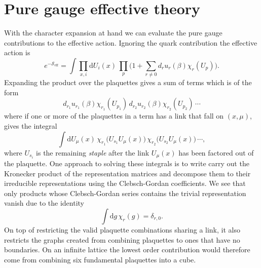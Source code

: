 \section{Pure gauge effective theory}

With the character expansion at hand we can evaluate the pure gauge
contributions to the effective action. Ignoring the quark contribution the
effective action is
%
\begin{equation}
  e^{-\mathcal{S}_{\text{eff}}} = \int \prod_{x, i} \mathrm{d} U_i(x) \, \prod_p
    \bigg(1 + \sum_{r \neq 0} d_r u_r(\beta) \chi_r (U_p) \bigg).
\end{equation}
%
Expanding the product over the plaquettes gives a sum of terms which is of the
form
%
\begin{equation}
  d_{r_1} u_{r_1}(\beta) \chi_{r_1}(U_{p_1}) \, 
  d_{r_2} u_{r_2}(\beta) \chi_{r_2}(U_{p_2}) \, \cdots
\end{equation}
%
where if one or more of the plaquettes in a term has a link that fall on
$(x,\mu)$, gives the integral
%
\begin{equation}
  \int \mathrm{d} U_{\mu}(x) \, \chi_{r_1} \big(U_{s_1} U_{\mu}(x) \big) \,
    \chi_{r_2} \big(U_{s_2} U_{\mu}(x) \big) \, \cdots,
\end{equation}
%
where $U_{s_i}$ is the remaining \emph{staple} after the link $U_{\mu}(x)$ has
been factored out of the plaquette. One approach to solving these integrals is
to write carry out the Kronecker product of the representation matrices and
decompose them to their irreducible representations using the Clebsch-Gordan
coefficients. We see that only products whose Clebsch-Gordan series contains the
trivial representation vanish due to the identity
%
\begin{equation}
  \int \mathrm{d} g \, \chi_r (g) = \delta_{r,0}.
\end{equation}
%
On top of restricting the valid plaquette combinations sharing a link, it also
restricts the graphs created from combining plaquettes to ones that have no
boundaries. On an infinite lattice the lowest order contribution would therefore
come from combining six fundamental plaquettes into a cube.

